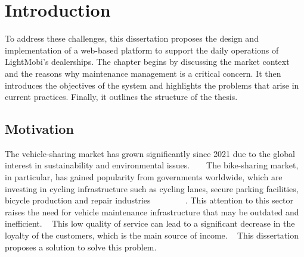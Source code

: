 \chapter{Introduction}%
\label{chapter:introduction}

\begin{introduction}

To address these challenges, this dissertation proposes the design and implementation of a web-based platform to support the daily operations of LightMobi's dealerships. The chapter begins by discussing the market context and the reasons why maintenance management is a critical concern. It then introduces the objectives of the system and highlights the problems that arise in current practices. Finally, it outlines the structure of the thesis.

\end{introduction} 


\section{Motivation}

The vehicle-sharing market has grown significantly since 2021 due to the global interest in sustainability and environmental issues. ~\cite{cohesionOpenData} ~\cite{bike_data_businessresearch}
The bike-sharing market, in particular, has gained popularity from governments worldwide, which are investing in cycling infrastructure such as cycling lanes, secure parking facilities, bicycle production and repair industries ~\cite{Clercq2023} ~\cite{Cerro2024} ~\cite{European_declararion_on_cycling} ~\cite{bike_data_businessresearch} ~\cite{cohesionOpenData}.
This attention to this sector raises the need for vehicle maintenance infrastructure that may be outdated and inefficient. ~\cite{MAS_MOTORS}
This low quality of service can lead to a significant decrease in the loyalty of the customers, which is the main source of income. ~\cite{Setting_the_after_sale_process}
This dissertation proposes a solution to solve this problem.

